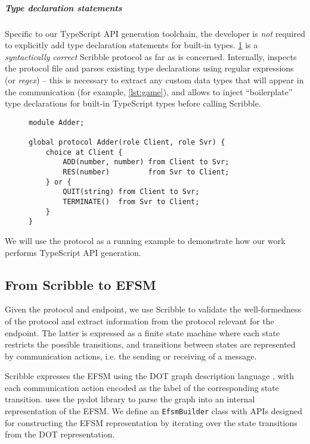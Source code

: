 \subparagraph{Type declaration statements}
Specific to our TypeScript API generation toolchain,
the developer is \textit{not} required to explicitly
add type declaration statements for built-in types.
\cref{lst:adder} is a \textit{syntactically correct}
Scribble protocol as far as 
 is concerned. 
Internally,  inspects the protocol file
and parses existing type declarations using regular expressions
(or \textit{regex}) -- this is necessary to extract any
custom data types that will appear in the communication (for example,
\cref{lst:game}), and allows  to inject
``boilerplate'' type declarations for built-in TypeScript types before
calling Scribble.

\begin{figure}[!ht]
\begin{lstlisting}[language=Scribble]
module Adder;

global protocol Adder(role Client, role Svr) {
	choice at Client {
		ADD(number, number) from Client to Svr;
		RES(number)         from Svr to Client;	
	} or {
		QUIT(string) from Client to Svr;	
		TERMINATE()  from Svr to Client;
	}
}
\end{lstlisting}
\label{lst:adder}
\end{figure}

We will use the  protocol as a running example
to demonstrate how our work performs TypeScript API generation.

\subsection{From Scribble to EFSM}
\label{subsection:efsm}

Given the protocol and endpoint, we use Scribble
to validate the well-formedness of the protocol and extract
information from the protocol relevant for the endpoint.
The latter is expressed as a finite state machine
where each state restricts the possible transitions, 
and transitions between states are represented by
communication actions, i.e. the sending or receiving of a message.

Scribble expresses the EFSM using the 
DOT graph description language \cite{dot}, with each
communication action encoded as the label of the corresponding
state transition. 
 uses the pydot library \cite{pydot}
to parse the graph into an internal representation of the EFSM.
We define an \texttt{EfsmBuilder} class with APIs designed for
constructing the EFSM representation by iterating over the 
state transitions from the DOT representation.

